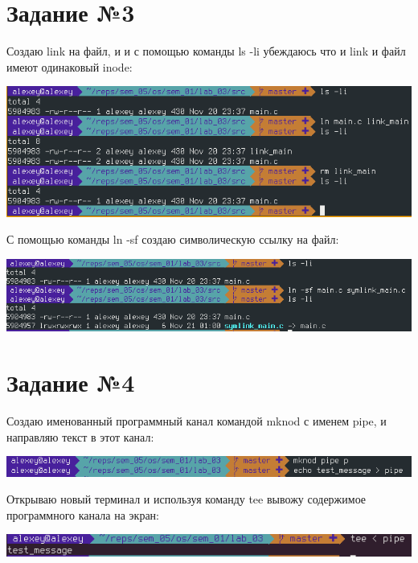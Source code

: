 \documentclass[12pt]{report}
\begin{document}
\chapter{Задание №3}

Создаю link на файл, и и с помощью команды ls -li убеждаюсь что и link и файл имеют одинаковый inode:

\includegraphics[width=\linewidth]{img/task03_01.png}

С помощью команды ln -sf создаю символическую ссылку на файл:

\includegraphics[width=\linewidth]{img/task03_02.png}

\chapter{Задание №4}

Создаю именованный программный канал командой mknod с именем pipe, и направляю текст в этот канал:

\includegraphics[width=\linewidth]{img/task04_01.png}


Открываю новый терминал и используя команду tee вывожу содержимое программного канала на экран:

\includegraphics[width=\linewidth]{img/task04_02.png}


\end{document}
